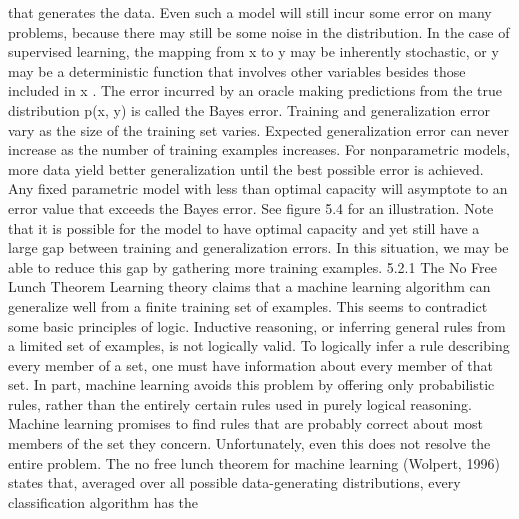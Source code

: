 \documentclass[11pt]{article}
\begin{document}
that generates the data. Even such a model will still incur some error on many
problems, because there may still be some noise in the distribution. In the case
of supervised learning, the mapping from
x
to
y
may be inherently stochastic,
or
y
may be a deterministic function that involves other variables besides those
included in
x
. The error incurred by an oracle making predictions from the true
distribution p(x, y) is called the Bayes error.
Training and generalization error vary as the size of the training set varies.
Expected generalization error can never increase as the number of training examples
increases. For nonparametric models, more data yield better generalization until
the best possible error is achieved. Any ﬁxed parametric model with less than
optimal capacity will asymptote to an error value that exceeds the Bayes error.
See ﬁgure 5.4 for an illustration. Note that it is possible for the model to have
optimal capacity and yet still have a large gap between training and generalization
errors. In this situation, we may be able to reduce this gap by gathering more
training examples.
5.2.1 The No Free Lunch Theorem
Learning theory claims that a machine learning algorithm can generalize well from
a ﬁnite training set of examples. This seems to contradict some basic principles of
logic. Inductive reasoning, or inferring general rules from a limited set of examples,
is not logically valid. To logically infer a rule describing every member of a set,
one must have information about every member of that set.
In part, machine learning avoids this problem by oﬀering only probabilistic rules,
rather than the entirely certain rules used in purely logical reasoning. Machine
learning promises to ﬁnd rules that are probably correct about most members of
the set they concern.
Unfortunately, even this does not resolve the entire problem. The
no free
lunch theorem
for machine learning (Wolpert, 1996) states that, averaged over
all possible data-generating distributions, every classiﬁcation algorithm has the
\end{document}
